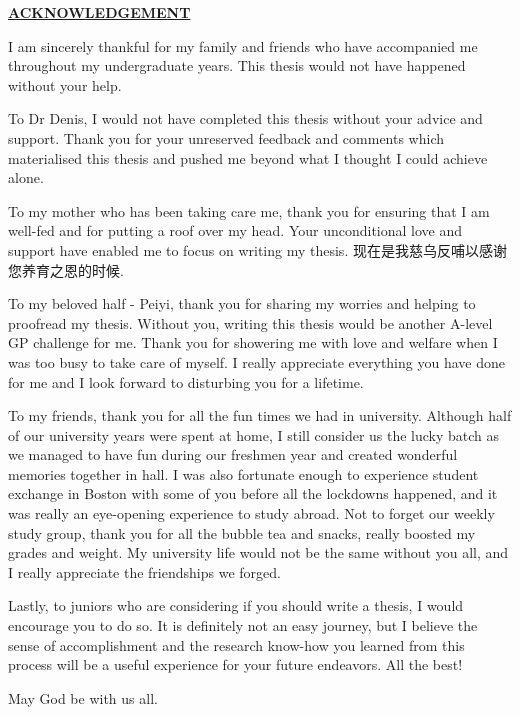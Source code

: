 \begin{center}
    \textbf{\underline{\uppercase{ACKNOWLEDGEMENT}}}
\end{center}

I am sincerely thankful for my family and friends who have
accompanied me throughout my undergraduate years. This
thesis would not have happened without your help.

To Dr Denis, I would not have completed this thesis
without your advice and support. Thank you for your
unreserved feedback and comments which materialised this thesis
and pushed me beyond what I thought I could achieve alone.

To my mother who has been taking care me,
thank you for ensuring that I
am well-fed and for putting a roof over my head. Your
unconditional love and support have enabled me to focus on
writing my thesis.
现在是我慈乌反哺以感谢您养育之恩的时候.

To my beloved half - Peiyi, thank you for sharing my worries
and helping to proofread my thesis. Without you, writing
this thesis would be another A-level GP challenge for me.
Thank you for showering me with love and welfare when I was
too busy to take care of myself. I really appreciate
everything you have done for me and I look forward to
disturbing you for a lifetime.

To my friends, thank you for all the fun times we had in
university. Although half of our university years were spent
at home, I still consider us the lucky batch as we managed
to have fun during our freshmen year and created wonderful
memories together in hall. I was also fortunate enough to
experience student exchange in Boston with some of you
before all the lockdowns happened, and it was really an
eye-opening experience to study abroad. 
Not to forget our weekly study group, thank you for all the
bubble tea and snacks, really boosted my grades and weight.
My university life
would not be the same without you all, and I really
appreciate the friendships we forged.

Lastly, to juniors who are considering if you should write a
thesis, I would encourage you to do so. It is definitely not
an easy journey, but I believe the sense of accomplishment
and the research know-how you learned from this process will
be a useful experience for your future endeavors. All the
best!

May God be with us all.
